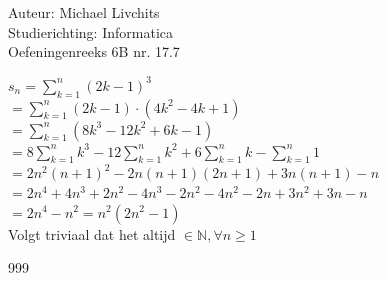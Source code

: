 \documentclass[a4paper]{article}
\begin{document}
  
\noindent \large Auteur: Michael Livchits \\
\noindent \large Studierichting: Informatica\\
\noindent \large Oefeningenreeks 6B nr. 17.7\\

\medskip

\normalsize

$\displaystyle s_n=\sum_{k=1}^{n}(2k-1)^3$\\

$= \displaystyle\sum_{k=1}^{n}(2k-1)\cdot (4k^2-4k+1)$\\

$= \displaystyle\sum_{k=1}^{n}(8k^3-12k^2+6k-1)$\\

$= 8\displaystyle\sum_{k=1}^{n}k^3-12\displaystyle\sum_{k=1}^{n}k^2+6\displaystyle\sum_{k=1}^{n}k-\displaystyle\sum_{k=1}^{n}1$\\

$= 2n^2(n+1)^2-2n(n+1)(2n+1)+3n(n+1)-n$\\

$= 2n^4 + 4n^3 + 2n^2 -4n^3 - 2n^2 -4n^2 -2n + 3n^2 + 3n -n$\\

$= 2n^4-n^2 = n^2(2n^2-1)$\\

Volgt triviaal dat het altijd $\in \mathbb{N},\forall n \geq 1$\\

\begin{thebibliography}{999}
\end{thebibliography}
\end{document}
